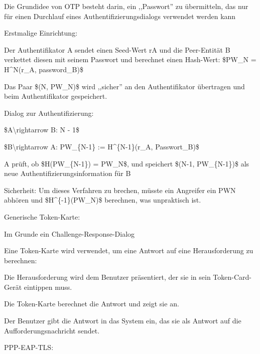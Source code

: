 \documentclass[a4paper]{article}
\begin{document}
\begin{multicols}{3}
\begin{itemize*}
            \begin{itemize*}
                  \item Die Grundidee von OTP besteht darin, ein ,,Passwort'' zu übermitteln, das nur für einen Durchlauf eines Authentifizierungsdialogs verwendet werden kann
                  \item Erstmalige Einrichtung:
                  \begin{itemize*} \item Der Authentifikator A sendet einen Seed-Wert rA und die Peer-Entität B verkettet diesen mit seinem Passwort und berechnet einen Hash-Wert: \$PW\_N = H\^{}N(r\_A, password\_B)\$ \item Das Paar \$(N, PW\_N)\$ wird ,,sicher'' an den Authentifikator übertragen und beim Authentifikator gespeichert. \end{itemize*}
                  \item Dialog zur Authentifizierung:
                  \begin{itemize*} \item \$A\textbackslash rightarrow B: N - 1\$ \item \$B\textbackslash rightarrow A: PW\_\{N-1\} := H\^{}\{N-1\}(r\_A, Passwort\_B)\$ \item A prüft, ob \$H(PW\_\{N-1\}) = PW\_N\$, und speichert \$(N-1, PW\_\{N-1\})\$ als neue Authentifizierungsinformation für B \end{itemize*}
                  \item Sicherheit: Um dieses Verfahren zu brechen, müsste ein Angreifer ein PWN abhören und \$H\^{}\{-1\}(PW\_N)\$ berechnen, was unpraktisch ist.
            \end{itemize*}
            \item
            Generische Token-Karte:

            \begin{itemize*}
                  \item Im Grunde ein Challenge-Response-Dialog
                  \item Eine Token-Karte wird verwendet, um eine Antwort auf eine Herausforderung zu berechnen:
                  \begin{itemize*} \item Die Herausforderung wird dem Benutzer präsentiert, der sie in sein Token-Card-Gerät eintippen muss. \item Die Token-Karte berechnet die Antwort und zeigt sie an. \item Der Benutzer gibt die Antwort in das System ein, das sie als Antwort auf die Aufforderungsnachricht sendet. \end{itemize*}
            \end{itemize*}
            \item
            PPP-EAP-TLS:


\end{itemize*}
\end{multicols}
\end{document}

